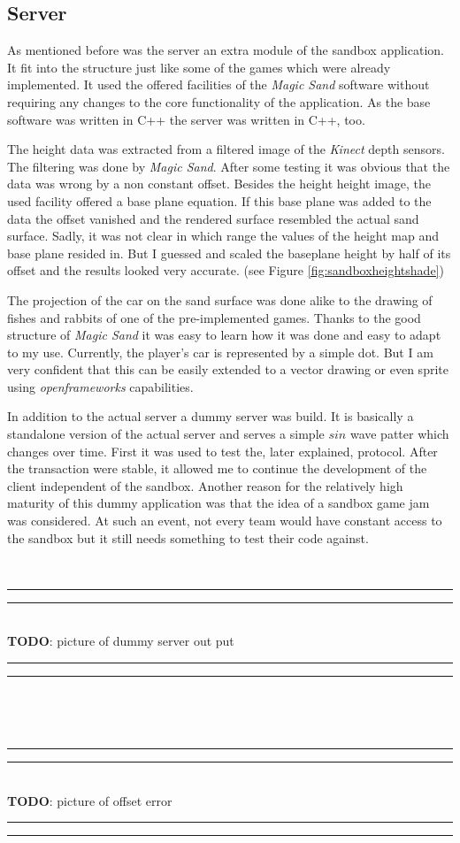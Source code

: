 \documentclass[12pt,a4paper,twoside,titlepage,headsepline,numbers=noenddot,listof=totoc,index=totoc,bibliography=totoc]{scrartcl}
\theoremstyle{break}
\providecommand{\TODO}[1]{{\small ~\\\hrule\vspace{0.1cm}\hrule~\\\textbf{TODO}:  #1~\\\hrule\vspace{0.1cm}\hrule~\\}}
\begin{document}
\subsection{Server}
As mentioned before was the server an extra module of the sandbox application. It fit into the structure just like some of the games which were already implemented. It used the offered facilities of the \textit{Magic Sand} software without requiring any changes to the core functionality of the application. As the base software was written in C++ the server was written in C++, too.



The height data was extracted from a filtered image of the \textit{Kinect} depth sensors. The filtering was done by \textit{Magic Sand}. After some testing it was obvious that the data was wrong by a non constant offset. Besides the height height image, the used facility offered a base plane equation. If this base plane was added to the data the offset vanished and the rendered surface resembled the actual sand surface. Sadly, it was not clear in which range the values of the height map and base plane resided in. But I guessed and scaled the baseplane height by half of its offset and the results looked very accurate. (see Figure \ref{fig:sandboxheightshade})

The projection of the car on the sand surface was done alike to the drawing of fishes and rabbits of one of the pre-implemented games. Thanks to the good structure of \textit{Magic Sand} it was easy to learn how it was done and easy to adapt to my use. Currently, the player's car is represented by a simple dot. But I am very confident that this can be easily extended to a vector drawing or even sprite using \textit{openframeworks} capabilities. 

In addition to the actual server a dummy server was build. It is basically a standalone version of the actual server and serves a simple $sin$ wave patter which changes over time. First it was used to test the, later explained, protocol. After the transaction were stable, it allowed me to continue the development of the client independent of the sandbox. Another reason for the relatively high maturity of this dummy application was that the idea of a sandbox game jam was considered. At such an event, not every team would have constant access to the sandbox but it still needs something to test their code against.

\TODO{picture of dummy server out put}
\TODO{picture of offset error}
\end{document}
